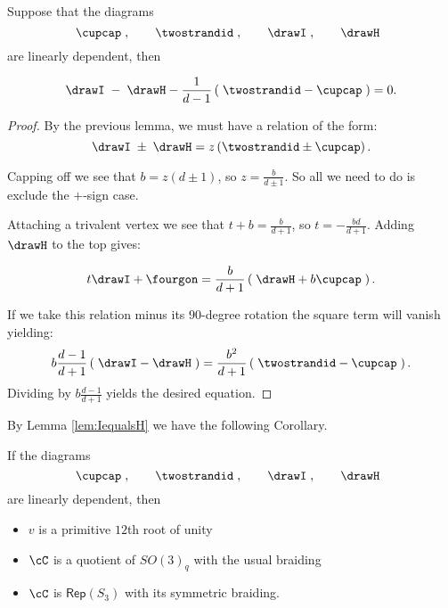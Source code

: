 \documentclass[12pt]{amsart}
\begin{document}
\begin{lemma}
Suppose that the diagrams   
  \[
  \cupcap\;,\qquad\twostrandid\;,
    \qquad\drawI\;,\qquad\drawH\;\;
   \]
are linearly dependent, then
 
$$\drawI\; - \; \drawH - \frac{1}{d-1} \left(\; \twostrandid - \cupcap \; \right) = 0.$$
\end{lemma}
\begin{proof}
By the previous lemma, we must have a relation of the form:
$$\drawI\;\pm \; \drawH = z \left(\twostrandid \pm \cupcap \right).$$

Capping off we see that $b= z (d \pm 1)$, so $z = \frac{b}{d \pm 1}$.  So all we need to do is exclude the $+$-sign case.

Attaching a trivalent vertex we see that $t + b = \frac{b}{d + 1}$, so $t =  -\frac{b d}{d + 1}$.  Adding $\drawH$ to the top gives:

$$t \drawI + \fourgon = \frac{b}{d+1} \left(\; \drawH + b \cupcap \; \right).$$

If we take this relation minus its $90$-degree rotation the square term will vanish yielding:
$$ b \frac{d-1}{d+1} \left(\; \drawI -\drawH \; \right) = \frac{b^2}{d+1} \left(\; \twostrandid - \cupcap \; \right).$$
Dividing by $b \frac{d-1}{d+1}$ yields the desired equation.
\end{proof}

By Lemma \ref{lem:IequalsH} we have the following Corollary.

\begin{corollary}
If the diagrams   
  \[
  \cupcap\;,\qquad\twostrandid\;,
    \qquad\drawI\;,\qquad\drawH\;\;
   \]
are linearly dependent, then
\begin{itemize}
\item $v$ is a primitive $12$th root of unity
\item $\cC$ is a quotient of $SO(3)_q$ with the usual braiding
\item $\cC$ is $\mathsf{Rep}(S_3)$ with its symmetric braiding.
\end{itemize}
\end{corollary}
\end{document}
